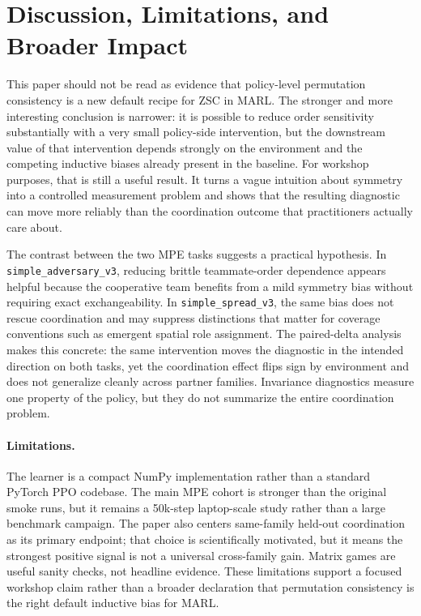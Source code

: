\documentclass{article}
\begin{document}
\section{Discussion, Limitations, and Broader Impact}
This paper should not be read as evidence that policy-level permutation consistency is a new default recipe for ZSC in MARL. The stronger and more interesting conclusion is narrower: it is possible to reduce order sensitivity substantially with a very small policy-side intervention, but the downstream value of that intervention depends strongly on the environment and the competing inductive biases already present in the baseline. For workshop purposes, that is still a useful result. It turns a vague intuition about symmetry into a controlled measurement problem and shows that the resulting diagnostic can move more reliably than the coordination outcome that practitioners actually care about.

The contrast between the two MPE tasks suggests a practical hypothesis. In \texttt{simple\_adversary\_v3}, reducing brittle teammate-order dependence appears helpful because the cooperative team benefits from a mild symmetry bias without requiring exact exchangeability. In \texttt{simple\_spread\_v3}, the same bias does not rescue coordination and may suppress distinctions that matter for coverage conventions such as emergent spatial role assignment. The paired-delta analysis makes this concrete: the same intervention moves the diagnostic in the intended direction on both tasks, yet the coordination effect flips sign by environment and does not generalize cleanly across partner families. Invariance diagnostics measure one property of the policy, but they do not summarize the entire coordination problem.

\paragraph{Limitations.}
The learner is a compact NumPy implementation rather than a standard PyTorch PPO codebase. The main MPE cohort is stronger than the original smoke runs, but it remains a 50k-step laptop-scale study rather than a large benchmark campaign. The paper also centers same-family held-out coordination as its primary endpoint; that choice is scientifically motivated, but it means the strongest positive signal is not a universal cross-family gain. Matrix games are useful sanity checks, not headline evidence. These limitations support a focused workshop claim rather than a broader declaration that permutation consistency is the right default inductive bias for MARL.
\end{document}
